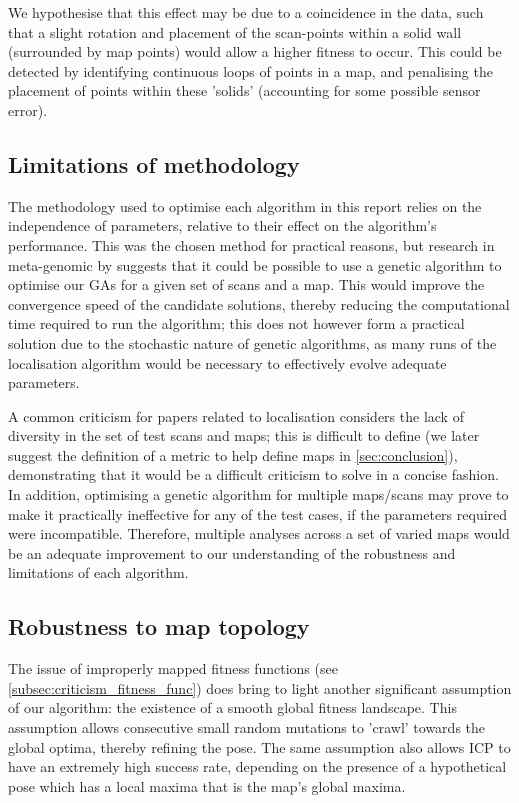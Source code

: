 \documentclass[authoryearcitations]{UoYCSproject}
\begin{document}
We hypothesise that this effect may be due to a coincidence in the data, such that a slight rotation and placement of the scan-points within a solid wall (surrounded by map points) would allow a higher fitness to occur. This could be detected by identifying continuous loops of points in a map, and penalising the placement of points within these 'solids' (accounting for some possible sensor error).

\subsection{Limitations of methodology}
The methodology used to optimise each algorithm in this report relies on the independence of parameters, relative to their effect on the algorithm's performance. This was the chosen method for practical reasons, but research in meta-genomic by \citet{Brain2011-pz} suggests that it could be possible to use a genetic algorithm to optimise our GAs for a given set of scans and a map. This would improve the convergence speed of the candidate solutions, thereby reducing the computational time required to run the algorithm; this does not however form a practical solution due to the stochastic nature of genetic algorithms, as many runs of the localisation algorithm would be necessary to effectively evolve adequate parameters. \newline

A common criticism for papers related to localisation considers the lack of diversity in the set of test scans and maps; this is difficult to define (we later suggest the definition of a metric to help define maps in \autoref{sec:conclusion}), demonstrating that it would be a difficult criticism to solve in a concise fashion. In addition, optimising a genetic algorithm for multiple maps/scans may prove to make it practically ineffective for any of the test cases, if the parameters required were incompatible. Therefore, multiple analyses across a set of varied maps would be an adequate improvement to our understanding of the robustness and limitations of each algorithm.

\subsection{Robustness to map topology}
\label{subsec:robustness_to_map_topology}

\color{red}
The issue of improperly mapped fitness functions (see \autoref{subsec:criticism_fitness_func}) does bring to light another significant assumption of our algorithm: the existence of a smooth global fitness landscape. This assumption allows consecutive small random mutations to 'crawl' towards the global optima, thereby refining the pose. The same assumption also allows ICP to have an extremely high success rate, depending on the presence of a hypothetical pose which has a local maxima that is the map's global maxima. \newline
\end{document}
